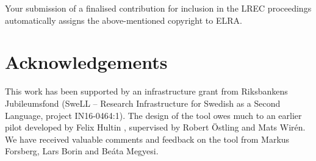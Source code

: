 \documentclass[10pt, a4paper]{article}
\begin{document}
Your submission of a finalised contribution for inclusion in the LREC
proceedings automatically assigns the above-mentioned copyright to ELRA.

\section{Acknowledgements}

This work has been supported by an infrastructure grant from Riksbankens Jubileumsfond (SweLL -- Research Infrastructure for Swedish as a Second Language, project IN16-0464:1). The design of the tool owes much to an earlier pilot developed by Felix Hultin \cite{correctAnnotator}, supervised by Robert Östling and Mats Wirén. We have received valuable comments and feedback on the tool from Markus Forsberg, Lars Borin and Beáta Megyesi.
\end{document}
